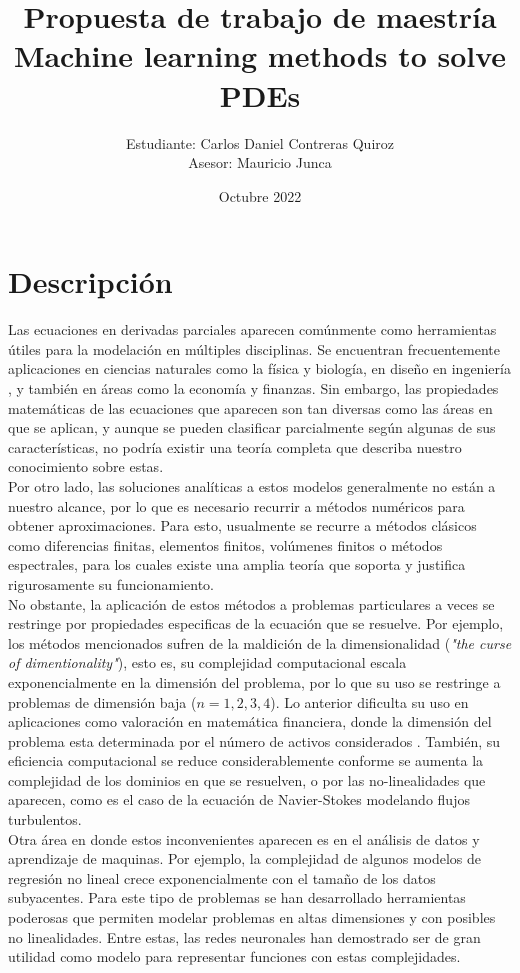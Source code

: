 \documentclass[a4paper,11pt]{scrartcl}
\title{Propuesta de trabajo de maestría\\
	Machine learning methods to solve PDEs}
\author{Estudiante: Carlos Daniel Contreras Quiroz\\	
	Asesor: Mauricio Junca}
\date{Octubre 2022}
\begin{document}
	
	\maketitle
	
	
	\section{Descripción}
	Las ecuaciones en derivadas parciales aparecen comúnmente como herramientas útiles para la modelación en múltiples disciplinas. Se encuentran frecuentemente aplicaciones en ciencias naturales como la física y biología, en diseño en ingeniería , y también en áreas como la economía y finanzas. Sin embargo, las propiedades matemáticas de las ecuaciones que aparecen son tan diversas como las áreas en que se aplican, y aunque se pueden clasificar parcialmente según algunas de sus características, no podría existir una teoría completa que describa nuestro conocimiento sobre estas.\\
	
	Por otro lado, las soluciones analíticas a estos modelos generalmente no están a nuestro alcance, por lo que es necesario recurrir a métodos numéricos para obtener aproximaciones. Para esto, usualmente se recurre a métodos clásicos como diferencias finitas, elementos finitos, volúmenes finitos o métodos espectrales, para los cuales existe una amplia teoría que soporta y justifica rigurosamente su funcionamiento.\\
	
	No obstante, la aplicación de estos métodos a problemas particulares a veces se restringe por propiedades especificas de la ecuación que se resuelve. Por ejemplo, los métodos mencionados sufren de la maldición de la dimensionalidad (\textit{"the curse of dimentionality"}), esto es, su complejidad computacional escala exponencialmente en la dimensión del problema, por lo que su uso se restringe a problemas de dimensión baja ($n=1,2,3,4$). Lo anterior dificulta su uso en aplicaciones como valoración en matemática financiera, donde la dimensión del problema esta determinada por el número de activos considerados . También, su eficiencia computacional se reduce considerablemente conforme se aumenta la complejidad de los dominios en que se resuelven, o por las no-linealidades que aparecen, como es el caso de la ecuación de Navier-Stokes modelando flujos turbulentos.\\
	
	Otra área en donde estos inconvenientes aparecen es en el análisis de datos y aprendizaje de maquinas. Por ejemplo, la complejidad de algunos modelos de regresión no lineal crece exponencialmente con el tamaño de los datos subyacentes. Para este tipo de problemas se han desarrollado herramientas poderosas que permiten modelar problemas en altas dimensiones y con posibles no linealidades. Entre estas, las redes neuronales han demostrado ser de gran utilidad como modelo para representar funciones con estas complejidades\cite{higham_deep_2019}.\\
	
\end{document}
